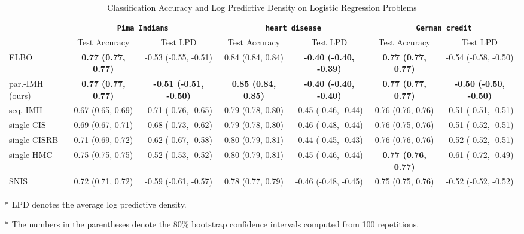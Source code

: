 
\begin{table*}
  \centering
  \caption{Classification Accuracy and Log Predictive Density on Logistic Regression Problems}\label{table:logistic}
  \setlength{\tabcolsep}{3pt}
  \begin{threeparttable}
  \begin{tabular}{lcccccc}
    \toprule
     & \multicolumn{2}{c}{\textbf{\texttt{Pima Indians}}} & \multicolumn{2}{c}{\textbf{\texttt{heart disease}}} & \multicolumn{2}{c}{\textbf{\texttt{German credit}}} \\
    \cmidrule(lr){2-3}\cmidrule(lr){4-5}\cmidrule(lr){6-7}
    & Test Accuracy & Test LPD
    & Test Accuracy & Test LPD
    & Test Accuracy & Test LPD \\\midrule
    ELBO & \textbf{0.77 {\scriptsize(0.77, 0.77)}} & -0.53 {\scriptsize(-0.55, -0.51)} & 0.84 {\scriptsize(0.84, 0.84)} & \textbf{-0.40 {\scriptsize(-0.40, -0.39)}} & \textbf{0.77 {\scriptsize(0.77, 0.77)}} & -0.54 {\scriptsize(-0.58, -0.50)}  \\\arrayrulecolor{black!30}\midrule
    par.-IMH (ours) & \textbf{0.77 {\scriptsize(0.77, 0.77)}} & \textbf{-0.51 {\scriptsize(-0.51, -0.50)}} & \textbf{0.85 {\scriptsize(0.84, 0.85)}} & \textbf{-0.40 {\scriptsize(-0.40, -0.40)}} & \textbf{0.77 {\scriptsize(0.77, 0.77)}} & \textbf{-0.50 {\scriptsize(-0.50, -0.50)}} \\
    seq.-IMH & 0.67 {\scriptsize(0.65, 0.69)} & -0.71 {\scriptsize(-0.76, -0.65)} & 0.79 {\scriptsize(0.78, 0.80)} & -0.45 {\scriptsize(-0.46, -0.44)} & 0.76 {\scriptsize(0.76, 0.76)} & -0.51 {\scriptsize(-0.51, -0.51)} \\
    single-CIS & 0.69 {\scriptsize(0.67, 0.71)} & -0.68 {\scriptsize(-0.73, -0.62)} & 0.79 {\scriptsize(0.78, 0.80)} & -0.46 {\scriptsize(-0.48, -0.44)} & 0.76 {\scriptsize(0.75, 0.76)} & -0.51 {\scriptsize(-0.52, -0.51)} \\
    single-CISRB & 0.71 {\scriptsize(0.69, 0.72)} & -0.62 {\scriptsize(-0.67, -0.58)} & 0.80 {\scriptsize(0.79, 0.81)} & -0.44 {\scriptsize(-0.45, -0.43)} & 0.76 {\scriptsize(0.76, 0.76)} & -0.52 {\scriptsize(-0.52, -0.51)} \\
    single-HMC & 0.75 {\scriptsize(0.75, 0.75)} & -0.52 {\scriptsize(-0.53, -0.52)} & 0.80 {\scriptsize(0.79, 0.81)} & -0.45 {\scriptsize(-0.46, -0.44)} & \textbf{0.77 {\scriptsize(0.76, 0.77)}} & -0.61 {\scriptsize(-0.72, -0.49)} \\
    SNIS & 0.72 {\scriptsize(0.71, 0.72)} & -0.59 {\scriptsize(-0.61, -0.57)} & 0.78 {\scriptsize(0.77, 0.79)} & -0.46 {\scriptsize(-0.48, -0.45)} & 0.75 {\scriptsize(0.75, 0.76)} & -0.52 {\scriptsize(-0.52, -0.52)} \\\bottomrule
  \end{tabular}
  \begin{tablenotes}
    \item[*]{\footnotesize LPD denotes the average log predictive density.}
    \item[*]{\footnotesize The numbers in the parentheses denote the 80\% bootstrap confidence intervals computed from 100 repetitions.}
  \end{tablenotes}
  \end{threeparttable}
\end{table*}

